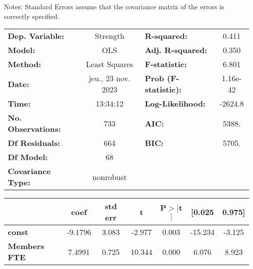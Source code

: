 \documentclass[ 11pt]{article}
\begin{document}
Notes: \newline
 [1] Standard Errors assume that the covariance matrix of the errors is correctly specified.\\
 \newpage
 \begin{center}
\begin{tabular}{lclc}
\toprule
\textbf{Dep. Variable:}                                    &      Strength      & \textbf{  R-squared:         } &     0.411   \\
\textbf{Model:}                                            &        OLS         & \textbf{  Adj. R-squared:    } &     0.350   \\
\textbf{Method:}                                           &   Least Squares    & \textbf{  F-statistic:       } &     6.801   \\
\textbf{Date:}                                             & jeu., 23 nov. 2023 & \textbf{  Prob (F-statistic):} &  1.16e-42   \\
\textbf{Time:}                                             &      13:34:12      & \textbf{  Log-Likelihood:    } &   -2624.8   \\
\textbf{No. Observations:}                                 &          733       & \textbf{  AIC:               } &     5388.   \\
\textbf{Df Residuals:}                                     &          664       & \textbf{  BIC:               } &     5705.   \\
\textbf{Df Model:}                                         &           68       & \textbf{                     } &             \\
\textbf{Covariance Type:}                                  &     nonrobust      & \textbf{                     } &             \\
\bottomrule
\end{tabular}
\begin{longtable}{lcccccc}
                                                           & \textbf{coef} & \textbf{std err} & \textbf{t} & \textbf{P$> |$t$|$} & \textbf{[0.025} & \textbf{0.975]}  \\
\midrule
\textbf{const}                                             &      -9.1796  &        3.083     &    -2.977  &         0.003        &      -15.234    &       -3.125     \\
\textbf{Members FTE}                                       &       7.4991  &        0.725     &    10.344  &         0.000        &        6.076    &        8.923     \\

\end{longtable}
\end{center}
\end{document}
